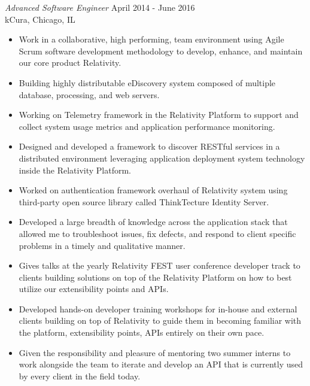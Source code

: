 \documentclass[margin]{res}
\newcommand{\tab}{\hspace*{2em}}
\begin{document}
\begin{resume}
{\sl Advanced Software Engineer} \hfill April 2014 - June 2016\\
	kCura, Chicago, IL		\tab	\tab\tab\tab\tab\tab\tab\tab			
	\begin{itemize}  \itemsep -2pt %
	\item Work in a collaborative, high performing, team environment using Agile Scrum software development methodology to develop, enhance, and maintain our core product Relativity.
	\item Building highly distributable eDiscovery system composed of multiple database, processing, and web servers.
	\item Working on Telemetry framework in the Relativity Platform to support and collect system usage metrics and application performance monitoring.
	\item Designed and developed a framework to discover RESTful services in a distributed environment leveraging application deployment system technology inside the Relativity Platform.
	\item Worked on authentication framework overhaul of Relativity system using third-party open source library called ThinkTecture Identity Server.
	\item Developed a large breadth of knowledge across the application stack that allowed me to troubleshoot issues, fix defects, and respond to client specific problems in a timely and qualitative manner.
	\item Gives talks at the yearly Relativity FEST user conference developer track to clients building solutions on top of the Relativity Platform on how to best utilize our extensibility points and APIs.
	\item Developed hands-on developer training workshops for in-house and external clients building on top of Relativity to guide them in becoming familiar with the platform, extensibility points, APIs entirely on their own pace.
	\item Given the responsibility and pleasure of mentoring two summer interns to work alongside the team to iterate and develop an API that is currently used by every client in the field today.
			\end{itemize}


\end{resume}
\end{document}
